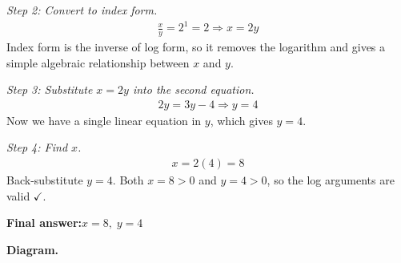 \documentclass[11pt]{article}
\begin{document}
\textit{Step 2: Convert to index form.}
\[\begin{gathered}
\frac{x}{y} = 2^1 = 2 \Rightarrow x = 2y
\end{gathered}\]
Index form is the inverse of log form, so it removes the logarithm and gives a simple algebraic relationship between \( x \) and \( y \).

\textit{Step 3: Substitute \( x = 2y \) into the second equation.}
\[\begin{gathered}
2y = 3y - 4 \Rightarrow y = 4
\end{gathered}\]
Now we have a single linear equation in \( y \), which gives \( y = 4 \).

\textit{Step 4: Find \( x \).}
\[\begin{gathered}
x = 2(4) = 8
\end{gathered}\]
Back-substitute \( y = 4 \). Both \( x = 8 > 0 \) and \( y = 4 > 0 \), so the log arguments are valid $\checkmark$.

\begin{answerbox}
\textbf{Final answer:}\quad \(\displaystyle  x = 8, \; y = 4 \)
\end{answerbox}
\textbf{Diagram.}
\end{document}
